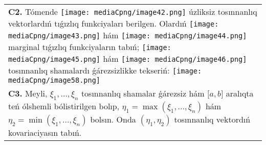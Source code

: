 \documentclass{article}
\begin{document}
\begin{tabular}{m{17cm}}
 \\
\textbf{C2.} Tómende \texttt{[image: mediaCpng/image42.png]} úzliksiz tosınnanlıq vektorlardıń tıǵızlıq funkciyaları berilgen. Olardıń \texttt{[image: mediaCpng/image43.png]} hám \texttt{[image: mediaCpng/image44.png]} marginal tıǵızlıq funkciyaların tabıń; \texttt{[image: mediaCpng/image45.png]} hám \texttt{[image: mediaCpng/image46.png]} tosınnanlıq shamalardı ǵárezsizlikke tekseriń: \texttt{[image: mediaCpng/image58.png]}
 \\
\textbf{C3.} Meyli, \(\xi_{1},...,\xi_{n}\) tosınnanlıq shamalar ǵárezsiz hám \(\lbrack a,b\rbrack\) aralıqta teń ólshemli bólistirilgen bolıp, \(\eta_{1} = \max\left( \xi_{1},...,\xi_{n} \right)\) hám \(\eta_{2} = \min\left( \xi_{1},...,\xi_{n} \right)\) bolsın. Onda \(\left( \eta_{1},\eta_{2} \right)\) tosınnanlıq vektordıń kovariaciyasın tabıń.
 \\

\end{tabular}
\vspace{1cm}
\end{document}
